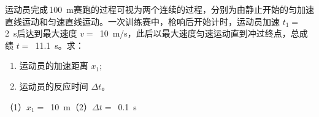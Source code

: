 运动员完成\,\qty{100}{m}赛跑的过程可视为两个连续的过程，分别为由静止开始的匀加速直线运动和匀速直线运动。一次训练赛中，枪响后开始计时，运动员加速 \(t_1 =\) \,\qty{2}{s}后达到最大速度 \(v =\) \,\qty{10}{m/s}，此后以最大速度匀速运动直到冲过终点，总成绩 \(t =\) \,\qty{11.1}{s}。求：
\begin{enumerate}
	\item 运动员的加速距离 \(x_1\);
	\item 运动员的反应时间 \(\Delta t\)。
\end{enumerate}
\begin{answer}
	（1）\(x_1=\) \,\qty{10}{m}（2）\(\Delta t =\) \,\qty{0.1}{s}
\end{answer}